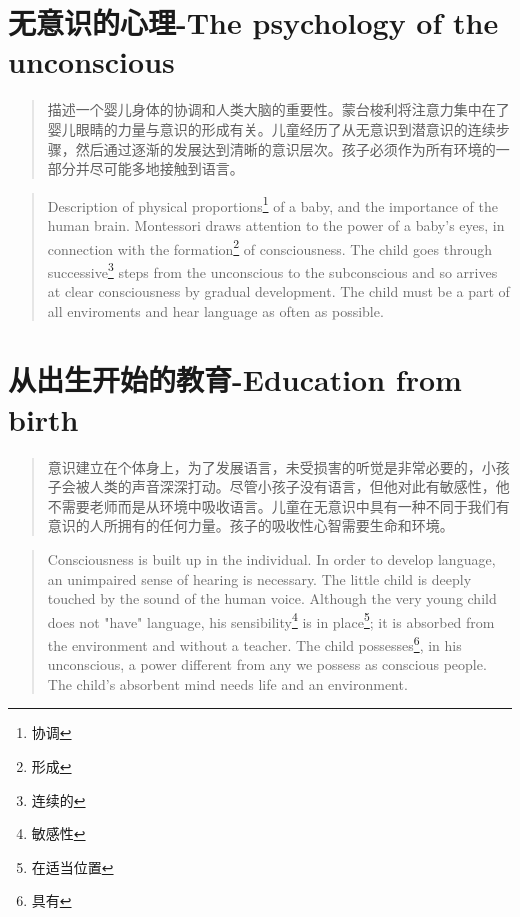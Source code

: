 \documentclass[lang=cn,10pt]{elegantbook}
\begin{document}
\chapter{无意识的心理-The psychology of the unconscious}

\begin{quote}
{\small 描述一个婴儿身体的协调和人类大脑的重要性。蒙台梭利将注意力集中在了婴儿眼睛的力量与意识的形成有关。儿童经历了从无意识到潜意识的连续步骤，然后通过逐渐的发展达到清晰的意识层次。孩子必须作为所有环境的一部分并尽可能多地接触到语言。}
\end{quote}

\begin{tcolorbox}
\begin{quote}
{\small Description of physical proportions\footnote{协调} of a baby, and the importance of the human brain. Montessori draws attention to the power of a baby's eyes, in connection with the formation\footnote{形成} of consciousness. The child goes through successive\footnote{连续的} steps from the unconscious to the subconscious and so arrives at clear consciousness by gradual development. The child must be a part of all enviroments and hear language as often as possible.}
\end{quote}
\end{tcolorbox}

\chapter{从出生开始的教育-Education from birth}

\begin{quote}
{\small 意识建立在个体身上，为了发展语言，未受损害的听觉是非常必要的，小孩子会被人类的声音深深打动。尽管小孩子没有语言，但他对此有敏感性，他不需要老师而是从环境中吸收语言。儿童在无意识中具有一种不同于我们有意识的人所拥有的任何力量。孩子的吸收性心智需要生命和环境。}
\end{quote}

\begin{tcolorbox}
\begin{quote}
{\small Consciousness is built up in the individual. In order to develop language, an unimpaired sense of hearing is necessary. The little child is deeply touched by the sound of the human voice. Although the very young child does not "have" language, his sensibility\footnote{敏感性} is in place\footnote{在适当位置}; it is absorbed from the environment and without a teacher. The child possesses\footnote{具有}, in his unconscious, a power different from any we possess as conscious people. The child's absorbent mind needs life and an environment.}
\end{quote}
\end{tcolorbox}
\end{document}

